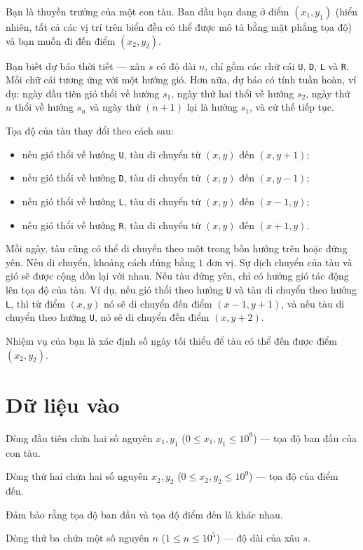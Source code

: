 \documentclass[12pt,a4paper]{article}
\begin{document}
Bạn là thuyền trưởng của một con tàu. Ban đầu bạn đang ở điểm $(x_1, y_1)$ (hiển nhiên, tất cả các vị trí trên biển đều có thể được mô tả bằng mặt phẳng tọa độ) và bạn muốn đi đến điểm $(x_2, y_2)$.

Bạn biết dự báo thời tiết — xâu $s$ có độ dài $n$, chỉ gồm các chữ cái \texttt{U}, \texttt{D}, \texttt{L} và \texttt{R}. Mỗi chữ cái tương ứng với một hướng gió. Hơn nữa, dự báo có tính tuần hoàn, ví dụ: ngày đầu tiên gió thổi về hướng $s_1$, ngày thứ hai thổi về hướng $s_2$, ngày thứ $n$ thổi về hướng $s_n$ và ngày thứ $(n+1)$ lại là hướng $s_1$, và cứ thế tiếp tục.

Tọa độ của tàu thay đổi theo cách sau:
\begin{itemize}[itemsep=0pt,topsep=2pt]
  \item nếu gió thổi về hướng \texttt{U}, tàu di chuyển từ $(x, y)$ đến $(x, y + 1)$;
  \item nếu gió thổi về hướng \texttt{D}, tàu di chuyển từ $(x, y)$ đến $(x, y - 1)$;
  \item nếu gió thổi về hướng \texttt{L}, tàu di chuyển từ $(x, y)$ đến $(x - 1, y)$;
  \item nếu gió thổi về hướng \texttt{R}, tàu di chuyển từ $(x, y)$ đến $(x + 1, y)$.
\end{itemize}

Mỗi ngày, tàu cũng có thể di chuyển theo một trong bốn hướng trên hoặc đứng yên. Nếu di chuyển, khoảng cách đúng bằng $1$ đơn vị. Sự dịch chuyển của tàu và gió sẽ được cộng dồn lại với nhau. Nếu tàu đứng yên, chỉ có hướng gió tác động lên tọa độ của tàu. Ví dụ, nếu gió thổi theo hướng \texttt{U} và tàu di chuyển theo hướng \texttt{L}, thì từ điểm $(x, y)$ nó sẽ di chuyển đến điểm $(x - 1, y + 1)$, và nếu tàu di chuyển theo hướng \texttt{U}, nó sẽ di chuyển đến điểm $(x, y + 2)$.

Nhiệm vụ của bạn là xác định số ngày tối thiểu để tàu có thể đến được điểm $(x_2, y_2)$.

\section*{Dữ liệu vào}
Dòng đầu tiên chứa hai số nguyên $x_1, y_1$ ($0 \le x_1, y_1 \le 10^9$) — tọa độ ban đầu của con tàu.

Dòng thứ hai chứa hai số nguyên $x_2, y_2$ ($0 \le x_2, y_2 \le 10^9$) — tọa độ của điểm đến.

Đảm bảo rằng tọa độ ban đầu và tọa độ điểm đến là khác nhau.

Dòng thứ ba chứa một số nguyên $n$ ($1 \le n \le 10^5$) — độ dài của xâu $s$.
\end{document}
